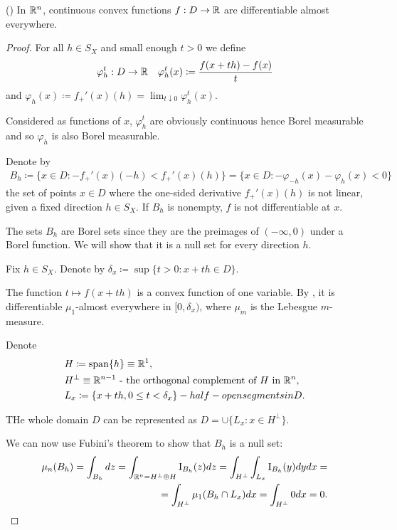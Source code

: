 \begin{theorem}\label{thm:rn_continuous_convex_frechet_almost_everywhere}(\cite[exercise 1.17]{Phelps1993})
  In $\mathbb{R}^n$, continuous convex functions $f: D \to \mathbb{R}$ are differentiable almost everywhere.
\end{theorem}
\begin{proof}
  For all $h \in S_X$ and small enough $t > 0$ we define
  \begin{align*}
    &\varphi_h^t: D \to \mathbb{R}
    &\varphi_h^t(x) \coloneqq \frac {f(x + th) - f(x)} t
  \end{align*}
  and $\varphi_h(x) \coloneqq f_+'(x)(h) = \lim_{t \downarrow 0} \varphi_h^t(x)$.

  Considered as functions of $x$, $\varphi_h^t$ are obviously continuous hence Borel measurable and so $\varphi_h$ is also Borel measurable.

  Denote by
  \begin{align*}
    B_h
    \coloneqq
    \{ x \in D \colon -f_+'(x)(-h) < f_+'(x)(h) \}
    =
    \{ x \in D \colon -\varphi_{-h}(x) - \varphi_h(x) < 0 \}
  \end{align*}
  the set of points $x \in D$ where the one-sided derivative $f_+'(x)(h)$ is not linear, given a fixed direction $h \in S_X$. If $B_h$ is nonempty, $f$ is not differentiable at $x$.

  The sets $B_h$ are Borel sets since they are the preimages of $(-\infty, 0)$ under a Borel function. We will show that it is a null set for every direction $h$.

  Fix $h \in S_X$. Denote by $\delta_x \coloneqq \sup \{ t > 0 \colon x + th \in D \}$.

  The function $t \mapsto f(x + th)$ is a convex function of one variable. By \cite[theorem 1.16]{Phelps1993}, it is differentiable $\mu_1$-almost everywhere in $[0, \delta_x)$, where $\mu_m$ is the Lebesgue $m$-measure.

  Denote
  \begin{align*}
    &H \coloneqq \operatorname{span}\{ h \} \equiv \mathbb{R}^1,
    \\
    &H^\perp \equiv \mathbb{R}^{n-1} \text{ - the orthogonal complement of $H$ in $\mathbb{R}^n$},
    \\
    &L_x \coloneqq \{ x + th, 0 \leq t < \delta_x \} - half-open segments in D.
  \end{align*}

  THe whole domain $D$ can be represented as $D = \cup \{ L_x \colon x \in H^\perp \}$.

  We can now use Fubini's theorem to show that $B_h$ is a null set:
  \begin{align*}
    \mu_n(B_h)
    =
    \int_{B_h} dz
    =
    \int_{\mathbb{R}^n = H^\perp \oplus H} \operatorname{I}_{B_h} (z) dz
    =
    \int_{H^\perp} \int_{L_x} \operatorname{I}_{B_h} (y) dy dx
    = \\ =
    \int_{H^\perp} \mu_1(B_h \cap L_x) dx
    =
    \int_{H^\perp} 0 dx
    =
    0.
  \end{align*}


\end{proof}
